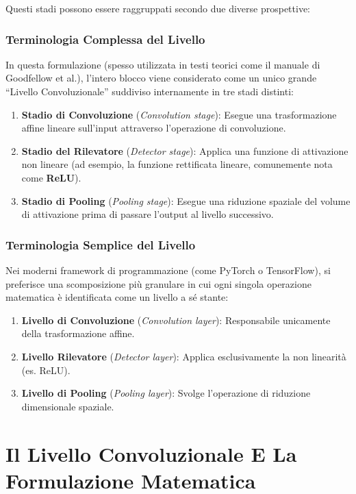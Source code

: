 ﻿\documentclass[11pt, a4paper]{article}
\begin{document}
Questi stadi possono essere raggruppati secondo due diverse prospettive:

\subsubsection{Terminologia Complessa del Livello}
In questa formulazione (spesso utilizzata in testi teorici come il manuale di Goodfellow et al.), l'intero blocco viene considerato come un unico grande ``Livello Convoluzionale'' suddiviso internamente in tre stadi distinti:
\begin{enumerate}
    \item \textbf{Stadio di Convoluzione} (\emph{Convolution stage}): Esegue una trasformazione affine lineare sull'input attraverso l'operazione di convoluzione.
    \item \textbf{Stadio del Rilevatore} (\emph{Detector stage}): Applica una funzione di attivazione non lineare (ad esempio, la funzione rettificata lineare, comunemente nota come \textbf{ReLU}).
    \item \textbf{Stadio di Pooling} (\emph{Pooling stage}): Esegue una riduzione spaziale del volume di attivazione prima di passare l'output al livello successivo.
\end{enumerate}

\subsubsection{Terminologia Semplice del Livello}
Nei moderni framework di programmazione (come PyTorch o TensorFlow), si preferisce una scomposizione più granulare in cui ogni singola operazione matematica è identificata come un livello a sé stante:
\begin{enumerate}
    \item \textbf{Livello di Convoluzione} (\emph{Convolution layer}): Responsabile unicamente della trasformazione affine.
    \item \textbf{Livello Rilevatore} (\emph{Detector layer}): Applica esclusivamente la non linearità (es. ReLU).
    \item \textbf{Livello di Pooling} (\emph{Pooling layer}): Svolge l'operazione di riduzione dimensionale spaziale.
\end{enumerate}

\newpage

\section{Il Livello Convoluzionale E La Formulazione Matematica}
\end{document}
